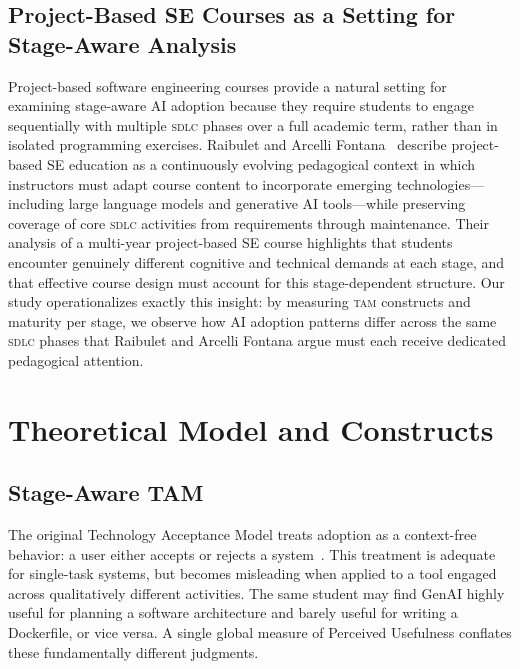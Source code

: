 \documentclass[sigconf,anonymous]{acmart}
\newcommand{\TAM}{\textsc{tam}\xspace}
\newcommand{\SDLC}{\textsc{sdlc}\xspace}
\newcommand{\GenAI}{GenAI\xspace}
\begin{document}
\subsection{Project-Based SE Courses as a Setting for Stage-Aware Analysis}
Project-based software engineering courses provide a natural setting for
examining stage-aware AI adoption because they require students to engage
sequentially with multiple \SDLC phases over a full academic term, rather
than in isolated programming exercises. Raibulet and Arcelli
Fontana~\cite{raibulet2025} describe project-based SE education as a
continuously evolving pedagogical context in which instructors must
adapt course content to incorporate emerging technologies---including
large language models and generative AI tools---while preserving
coverage of core \SDLC activities from requirements through maintenance.
Their analysis of a multi-year project-based SE course highlights that
students encounter genuinely different cognitive and technical demands
at each stage, and that effective course design must account for this
stage-dependent structure. Our study operationalizes exactly this
insight: by measuring \TAM constructs and maturity per stage, we observe
how AI adoption patterns differ across the same \SDLC phases that
Raibulet and Arcelli Fontana argue must each receive dedicated
pedagogical attention.

\section{Theoretical Model and Constructs}
\label{sec:model}

\subsection{Stage-Aware TAM}
The original Technology Acceptance Model treats adoption as a
context-free behavior: a user either accepts or rejects a
system~\cite{davis1989a, davis1989b}. This treatment is adequate for
single-task systems, but becomes misleading when applied to a tool
engaged across qualitatively different activities. The same student
may find \GenAI highly useful for planning a software architecture
and barely useful for writing a Dockerfile, or vice versa. A single
global measure of Perceived Usefulness conflates these fundamentally
different judgments.
\end{document}

